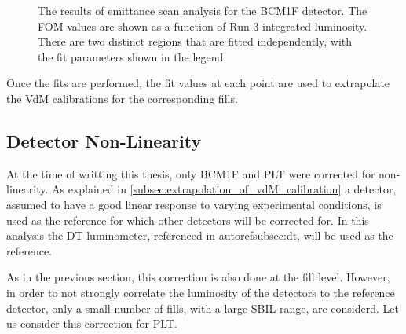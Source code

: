 \begin{figure}[!htb]
	\centering
	\caption[BCM1F efficiency analysis results]{The results of emittance scan analysis for the BCM1F detector. The FOM values are shown as a function of Run 3 integrated luminosity. There are two distinct regions that are fitted independently, with the fit parameters shown in the legend.}
	\label{fig:efficiency_bcm1f_example}
\end{figure}

Once the fits are performed, the fit values at each point are used to extrapolate the VdM calibrations for the corresponding fills.

\subsection{Detector Non-Linearity}
\label{subsec:detector_non_linearity}

At the time of writting this thesis, only BCM1F and PLT were corrected for non-linearity. As explained in \autoref{subsec:extrapolation_of_vdM_calibration} a detector, assumed to have a good linear response to varying experimental conditions, is used as the reference for which other detectors will be corrected for. In this analysis the DT luminometer, referenced in autoref{subsec:dt}, will be used as the reference.

As in the previous section, this correction is also done at the fill level. However, in order to not strongly correlate the luminosity of the detectors to the reference detector, only a small number of fills, with a large SBIL range, are considerd. Let us consider this correction for PLT.

